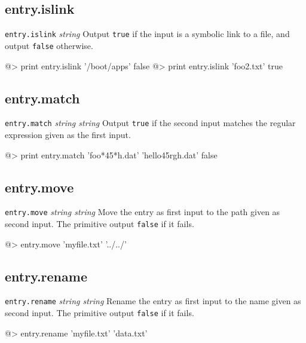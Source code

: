 \subsection*{entry.islink} 

{\tt entry.islink} {\it string}
\newline\newline
Output {\tt true} if the input is a symbolic link to a file, and output {\tt false} otherwise.
\begin{verbatimtab}
@> print entry.islink '/boot/apps'
false
@> print entry.islink 'foo2.txt'
true
\end{verbatimtab}

\subsection*{entry.match} 

{\tt entry.match} {\it string string}
\newline\newline
Output {\tt true} if the second input matches the regular expression given as the first input.
\begin{verbatimtab}
@> print entry.match 'foo*45*h.dat' 'hello45rgh.dat'
false
\end{verbatimtab}

\subsection*{entry.move} 

{\tt entry.move} {\it string string}
\newline\newline
Move the entry as first input to the path given as second input. The primitive output {\tt false} if it fails.
\begin{verbatimtab}
@> entry.move 'myfile.txt' '../../'
\end{verbatimtab}

\subsection*{entry.rename} 

{\tt entry.rename} {\it string string}
\newline\newline
Rename the entry as first input to the name given as second input. The primitive output {\tt false} if it fails.
\begin{verbatimtab}
@> entry.rename 'myfile.txt' 'data.txt'
\end{verbatimtab}

